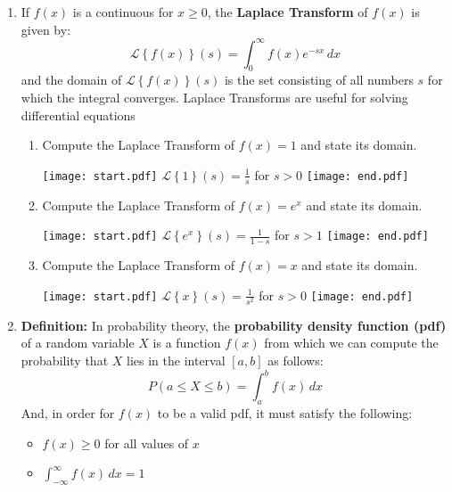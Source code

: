 \documentclass[12pt]{article}
\begin{document}
\begin{enumerate}
\begin{enumerate}
\end{enumerate}

\item If $f(x)$ is a continuous for $x \geq 0$, the {\bf Laplace Transform} of $f(x)$ is given by: $$\mathcal{L}\left\{f(x)\right\}(s)=\int_0^{\infty} f(x)e^{-sx}\,dx$$
and the domain of $\mathcal{L}\left\{f(x)\right\}(s)$ is the set consisting of all numbers $s$ for which the integral converges.  Laplace Transforms are useful for solving differential equations

\begin{enumerate}

\item Compute the Laplace Transform of $f(x)=1$ and state its domain.

\texttt{[image: start.pdf]}
{{$\mathcal{L}\left\{1\right\}(s)=\frac{1}{s}$ for $s >0$}}
\texttt{[image: end.pdf]}


\item Compute the Laplace Transform of $f(x)=e^x$ and state its domain.

\texttt{[image: start.pdf]}
{{$\mathcal{L}\left\{e^x\right\}(s)=\frac{1}{1-s}$ for $s >1$}}
\texttt{[image: end.pdf]}


\item Compute the Laplace Transform of $f(x)=x$ and state its domain.

\texttt{[image: start.pdf]}
{{$\mathcal{L}\left\{x\right\}(s)=\frac{1}{s^2}$ for $s >0$}}
\texttt{[image: end.pdf]}


\end{enumerate}

\item {\bf Definition:} In probability theory, the {\bf probability density function (pdf)} of a random variable $X$ is a function $f(x)$ from which we can compute the probability that $X$ lies in the interval $[a,b]$ as follows: $$P(a\leq X \leq b)=\int_a^b f(x) \,dx$$  And, in order for $f(x)$ to be a valid pdf, it must satisfy the following:

\begin{itemize}

\item $f(x) \geq 0$ for all values of $x$

\item $\int_{-\infty}^{\infty} f(x) \,dx=1$

\end{itemize}

\begin{enumerate}


\end{enumerate}
\end{enumerate}
\end{document}
